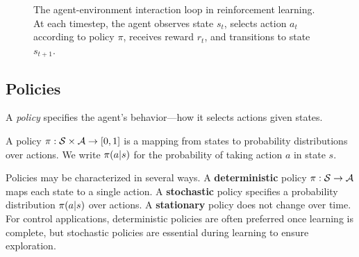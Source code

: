 \begin{figure}[htbp]
\centering
{}
\caption{The agent-environment interaction loop in reinforcement learning. At each timestep, the agent observes state $s_t$, selects action $a_t$ according to policy $\pi$, receives reward $r_t$, and transitions to state $s_{t+1}$.}
\label{fig:agent_env_loop}
\end{figure}

\subsection{Policies}

A \textit{policy} specifies the agent's behavior---how it selects actions given states.

\begin{definition}[Policy]
A policy $\pi: \mathcal{S} \times \mathcal{A} \rightarrow [0,1]$ is a mapping from states to probability distributions over actions. We write $\pi(a|s)$ for the probability of taking action $a$ in state $s$.
\end{definition}

Policies may be characterized in several ways. A \textbf{deterministic} policy $\pi: \mathcal{S} \rightarrow \mathcal{A}$ maps each state to a single action. A \textbf{stochastic} policy specifies a probability distribution $\pi(a|s)$ over actions. A \textbf{stationary} policy does not change over time. For control applications, deterministic policies are often preferred once learning is complete, but stochastic policies are essential during learning to ensure exploration.

